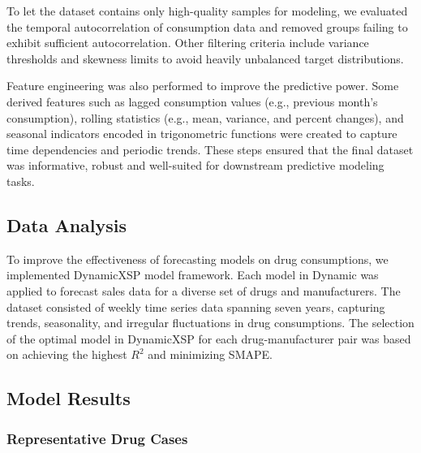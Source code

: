 \documentclass[journal]{IEEEtran}
\begin{document}
To let the dataset contains only high-quality samples for modeling, we evaluated the temporal autocorrelation of consumption data and removed groups failing to exhibit sufficient autocorrelation. Other filtering criteria include variance thresholds and skewness limits to avoid heavily unbalanced target distributions.

Feature engineering was also performed to improve the predictive power. Some derived features such as lagged consumption values (e.g., previous month’s consumption), rolling statistics (e.g., mean, variance, and percent changes), and seasonal indicators encoded in trigonometric functions were created to capture time dependencies and periodic trends. These steps ensured that the final dataset was informative, robust and well-suited for downstream predictive modeling tasks.


\subsection{Data Analysis}
To improve the effectiveness of forecasting models on drug consumptions, we implemented DynamicXSP model framework. Each model in Dynamic was applied to forecast sales data for a diverse set of drugs and manufacturers. The dataset consisted of weekly time series data spanning seven years, capturing trends, seasonality, and irregular fluctuations in drug consumptions. The selection of the optimal model in DynamicXSP for each drug-manufacturer pair was based on achieving the highest $R^2$ and minimizing SMAPE. 

\subsection{Model Results}
\subsubsection{Representative Drug Cases}
\end{document}
